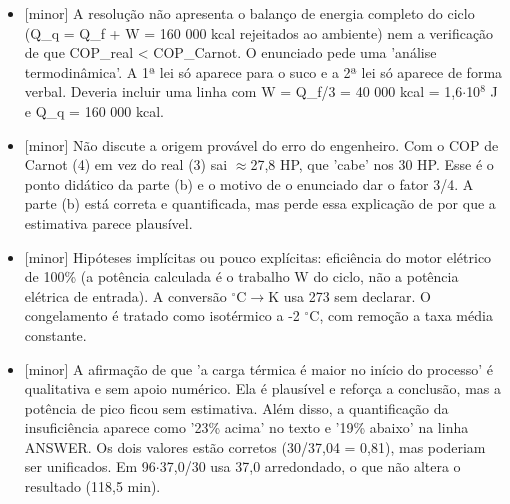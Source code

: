 \documentclass{article}%
\begin{document}
\begin{itemize}%
\item%
{[}minor{]} A resolução não apresenta o balanço de energia completo do ciclo (Q\_q = Q\_f + W = 160 000 kcal rejeitados ao ambiente) nem a verificação de que COP\_real < COP\_Carnot. O enunciado pede uma 'análise termodinâmica'. A 1ª lei só aparece para o suco e a 2ª lei só aparece de forma verbal. Deveria incluir uma linha com W = Q\_f/3 = 40 000 kcal = 1,6$\cdot$10$^{8}$ J e Q\_q = 160 000 kcal.%
\item%
{[}minor{]} Não discute a origem provável do erro do engenheiro. Com o COP de Carnot (4) em vez do real (3) sai $\approx$27,8 HP, que 'cabe' nos 30 HP. Esse é o ponto didático da parte (b) e o motivo de o enunciado dar o fator 3/4. A parte (b) está correta e quantificada, mas perde essa explicação de por que a estimativa parece plausível.%
\item%
{[}minor{]} Hipóteses implícitas ou pouco explícitas: eficiência do motor elétrico de 100\% (a potência calculada é o trabalho W do ciclo, não a potência elétrica de entrada). A conversão $^\circ$C$\to$K usa 273 sem declarar. O congelamento é tratado como isotérmico a -2 $^\circ$C, com remoção a taxa média constante.%
\item%
{[}minor{]} A afirmação de que 'a carga térmica é maior no início do processo' é qualitativa e sem apoio numérico. Ela é plausível e reforça a conclusão, mas a potência de pico ficou sem estimativa. Além disso, a quantificação da insuficiência aparece como '23\% acima' no texto e '19\% abaixo' na linha ANSWER. Os dois valores estão corretos (30/37,04 = 0,81), mas poderiam ser unificados. Em 96$\cdot$37,0/30 usa 37,0 arredondado, o que não altera o resultado (118,5 min).%
\end{itemize}%
\end{document}
